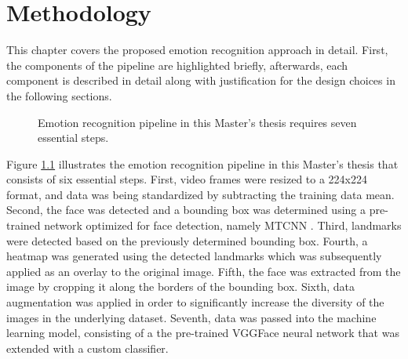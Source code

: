 \chapter{Methodology}
This chapter covers the proposed emotion recognition approach in detail. First, the components of the pipeline are highlighted briefly, afterwards, each component is described in detail along with justification for the design choices in the following sections. 

\begin{figure}[H]
  \begin{center}
  \caption{Emotion recognition pipeline in this Master's thesis requires seven essential steps.}
  \label{fig:MachineLearningModelMethods}
  \end{center}
\end{figure}

Figure \ref{fig:MachineLearningModelMethods} illustrates the emotion recognition pipeline in this Master's thesis that consists of six essential steps. First, video frames were resized to a 224x224 format, and data was being standardized by subtracting the training data mean. Second, the face was detected and a bounding box was determined using a pre-trained network optimized for face detection, namely MTCNN \citep{Zhang:2016:MTCCN}. Third, landmarks were detected based on the previously determined bounding box. 
\newline\newline
Fourth, a heatmap was generated using the detected landmarks which was subsequently applied as an overlay to the original image. Fifth, the face was extracted from the image by cropping it along the borders of the bounding box. Sixth, data augmentation was applied in order to significantly increase the diversity of the images in the underlying dataset. Seventh, data was passed into the machine learning model, consisting of a the pre-trained VGGFace neural network that was extended with a custom classifier.

